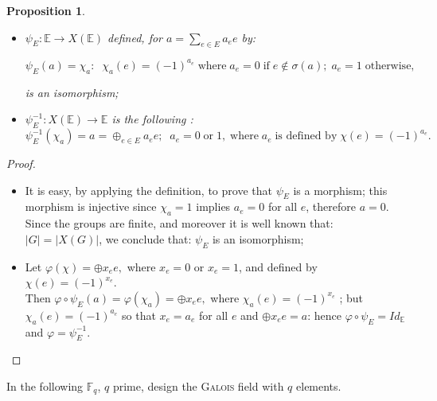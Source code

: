 \documentclass[preprint,12pt,authoryear]{elsarticle}
\newtheorem{prop}[thm]{Proposition}
\theoremstyle{definition}
\begin{document}
\begin{prop}\mbox{}\\
\begin{itemize}
\item[i)]  ${\displaystyle \psi_E : \mathbb{E} \longrightarrow X(\mathbb{E})}$ defined, for $a =\sum_{e \in E}a_e e$ by:

\[
\psi_E(a)=\chi_a : \;\; \chi_a(e)= (-1)^{a_e}\; \textrm{where}\; a_{e}=0\; \textrm{if}\; e\not\in \sigma(a); \;  a_{e}=1\; \textrm{otherwise}, 
\]

is an isomorphism; 
\item[ii)] $\psi^{-1}_{E} : X(\mathbb{E}) \longrightarrow \mathbb{E}$ is the following : 
$$\psi^{-1}_{E}( \chi_{a})= a= \oplus_{e \in E} a_e e; \;\; a_{e}=0\; \textrm{or}\; 1, \; \textrm{where} \;a_e\;\textrm{is defined by} \; \chi(e)=(-1)^{a_e}.$$
\end{itemize}
\end{prop}

\begin{proof}\mbox{}\\
\begin{itemize}
\item[i)] It is easy, by applying the definition, to prove  that $\psi_E$ is a morphism; this morphism is injective since $\chi_a=1$ implies $a_e=0$ for all $e$, therefore $a=0$.\\ Since the groups are finite, and moreover it is well known that: $\vert G\vert= \vert X(G)\vert$, we conclude that: $\psi_E$ is an isomorphism;
\item[ii)] 

Let $\varphi(\chi)= \oplus x_e e,$ where $x_e=0$ or  $x_e=1$, and defined by $\chi(e)=(-1)^{x_e}$. \\
Then $ \varphi \circ \psi_E(a)=\varphi(\chi_a)=\oplus x_e e,$ where $\chi_a(e)=(-1)^{x_e}$ ; but $\chi_a(e)=(-1)^{a_e}$ so that $x_e=a_e$ for all $e$ and $\oplus x_e e =a$: hence
$\varphi \circ \psi_E=Id_{\mathbb{E}}$ and $\varphi= \psi_E^{-1}.$ \qedhere
\end{itemize}
\end{proof}


In the following $\mathbb{F}_q$,  $q$ prime, design the  \textsc{Galois} field with $q$ elements.
\end{document}
